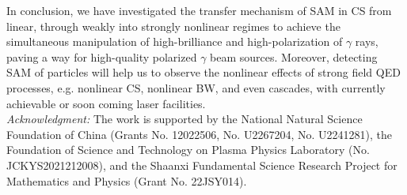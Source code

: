 \documentclass[10pt,twocolumn,showpacs,amsmath,amssymb,floatfix,superscriptaddress]{revtex4-2}
\begin{document}
In conclusion,  we have investigated the transfer mechanism of SAM in CS from linear, through weakly into strongly nonlinear regimes to achieve the simultaneous manipulation of high-brilliance and high-polarization of $\gamma$ rays, paving a way for high-quality polarized $\gamma$ beam sources. Moreover, detecting SAM of particles will help us to observe the nonlinear effects of strong field QED processes, e.g. nonlinear CS, nonlinear BW, and even cascades, with currently achievable or soon coming laser facilities.\\

{\emph{Acknowledgment:} The work is supported by the National Natural Science Foundation of China (Grants No. 12022506, No. U2267204, No. U2241281), the Foundation of Science and Technology on Plasma Physics Laboratory (No. JCKYS2021212008), and the Shaanxi Fundamental Science Research Project for Mathematics and Physics (Grant No. 22JSY014).}


\end{document}
